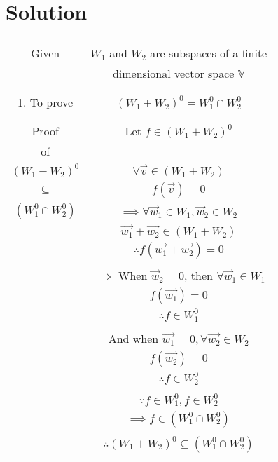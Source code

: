 \documentclass[journal,12pt,twocolumn]{IEEEtran}
\begin{document}
\section{Solution}
\begin{table}[h!]
\begin{center}
\begin{tabular}{|c|c|}
\hline
& \\
Given &  $W_1$ and $W_2$ are subspaces of a finite \\
& dimensional vector space $\mathbb V$\\
 & \\
\hline
& \\
1. To prove & $(W_1 + W_2)^0 = W_1^0 \cap W_2^0$\\
& \\
\hline
& \\
Proof & Let $f \in (W_1 + W_2)^0$\\
of & \\
$(W_1 + W_2)^0$ & $\forall \vec{v} \in (W_1 + W_2)$\\
$\subseteq$ & $f(\vec{v}) = 0$\\
$(W_1^0 \cap W_2^0)$ & $\implies \forall \vec{w}_1 \in W_1, \vec{w}_2 \in W_2$\\
& $\vec{w_1} + \vec{w_2} \in (W_1 + W_2)$\\
& $\therefore f(\vec{w_1} + \vec{w_2}) = 0$\\
& \\
& $\implies$ When $\vec{w}_2 = 0$, then $\forall \vec{w}_1 \in W_1$\\
& $f(\vec{w_1}) = 0$\\
& $\therefore f \in W_1^0$\\
& \\
& And when $\vec{w_1} = 0, \forall \vec{w_2} \in W_2$\\
& $f(\vec{w_2}) = 0$\\
& $\therefore f \in W_2^0$\\
& \\
& $\because f \in W_1^0, f \in W_2^0$\\
& $\implies f \in (W_1^0 \cap W_2^0)$\\
& \\
& $\therefore (W_1 + W_2)^0 \subseteq (W_1^0 \cap W_2^0)$\\
\hline
\end{tabular}
\end{center}
\end{table}
\end{document}
